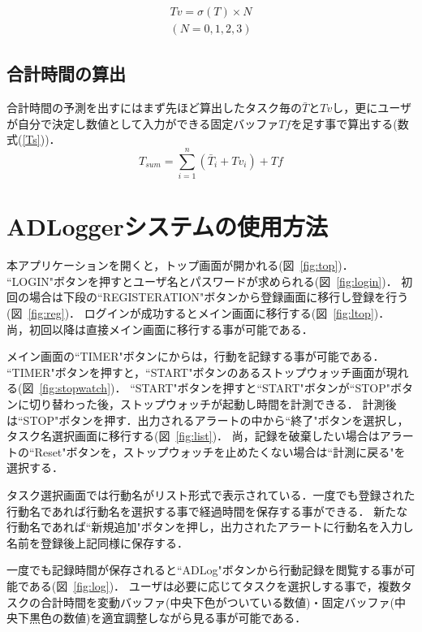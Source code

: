 \begin{eqnarray}
\label{Tv}
Tv=\sigma (T)×N \\
(N= 0, 1,2, 3 )\nonumber
\end{eqnarray}

\subsection{合計時間の算出}

合計時間の予測を出すにはまず先ほど算出したタスク毎の$\bar{T}$と$Tv$し，更にユーザが自分で決定し数値として入力ができる固定バッファ$Tf$を足す事で算出する(数式(\ref{Ts}))．
\begin{equation}
\label{Ts}
T_{sum}= \displaystyle\sum_{i=1}^{n} (\bar{T}_{i} + Tv_{i})+Tf
\end{equation}


\section{ADLoggerシステムの使用方法}
本アプリケーションを開くと，トップ画面が開かれる(図~\ref{fig:top})．
``LOGIN"ボタンを押すとユーザ名とパスワードが求められる(図~\ref{fig:login})．
初回の場合は下段の``REGISTERATION"ボタンから登録画面に移行し登録を行う(図~\ref{fig:reg})．
ログインが成功するとメイン画面に移行する(図~\ref{fig:ltop})．
尚，初回以降は直接メイン画面に移行する事が可能である．

メイン画面の``TIMER"ボタンにからは，行動を記録する事が可能である．
``TIMER"ボタンを押すと，``START"ボタンのあるストップウォッチ画面が現れる(図~\ref{fig:stopwatch})．
``START"ボタンを押すと``START"ボタンが``STOP"ボタンに切り替わった後，ストップウォッチが起動し時間を計測できる．
計測後は``STOP"ボタンを押す．出力されるアラートの中から``終了"ボタンを選択し，タスク名選択画面に移行する(図~\ref{fig:list})．
尚，記録を破棄したい場合はアラートの``Reset"ボタンを，ストップウォッチを止めたくない場合は``計測に戻る"を選択する．

タスク選択画面では行動名がリスト形式で表示されている．一度でも登録された行動名であれば行動名を選択する事で経過時間を保存する事ができる．
新たな行動名であれば``新規追加"ボタンを押し，出力されたアラートに行動名を入力し名前を登録後上記同様に保存する．

一度でも記録時間が保存されると``ADLog"ボタンから行動記録を閲覧する事が可能である(図~\ref{fig:log})．
ユーザは必要に応じてタスクを選択しする事で，複数タスクの合計時間を変動バッファ(中央下色がついている数値)・固定バッファ(中央下黒色の数値)を適宜調整しながら見る事が可能である．

